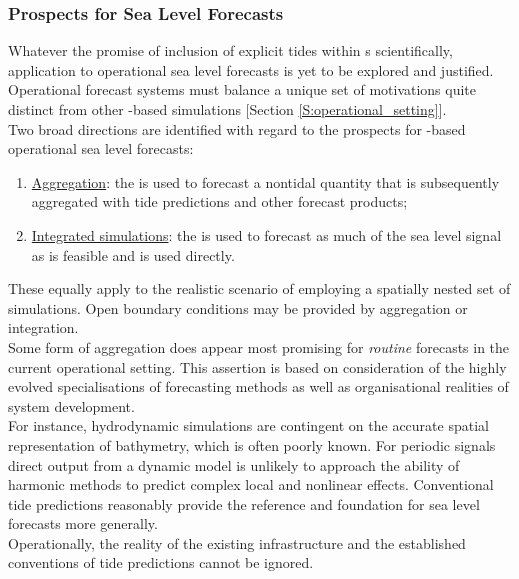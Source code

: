 \subsubsection{Prospects for Sea Level Forecasts}
\label{S:fc_prospects}

Whatever the promise of inclusion of explicit tides within \OGCM{}s scientifically, application to operational sea level forecasts is yet to be explored and justified.
Operational forecast systems must balance a unique set of motivations quite distinct from other \OGCM{}-based simulations [Section \ref{S:operational_setting}].  \\



Two broad directions are identified with regard to the prospects for \OGCM{}-based operational sea level forecasts:
\begin{enumerate}
\item \underline{Aggregation}: the \OGCM{} is used to forecast a nontidal quantity that is subsequently aggregated with tide predictions and other forecast products;
\item \underline{Integrated simulations}: the \OGCM{} is used to forecast as much of the sea level signal as is feasible and is used directly.
\end{enumerate}
These equally apply to the realistic scenario of employing a spatially nested set of simulations.  Open boundary conditions may be provided by aggregation or integration.\\



Some form of aggregation does appear most promising for \emph{routine} forecasts in the current operational setting.  This assertion is based on consideration of the highly evolved specialisations of forecasting methods as well as organisational realities of system development.\\
For instance, hydrodynamic simulations are contingent on the accurate spatial representation of bathymetry, which is often poorly known. For periodic signals direct output from a dynamic model is unlikely to approach the ability of harmonic methods to predict complex local and nonlinear effects.   Conventional tide predictions reasonably provide the reference and foundation for sea level forecasts more generally. \\
Operationally, the reality of the existing infrastructure and the established conventions of tide predictions cannot be ignored.\\



